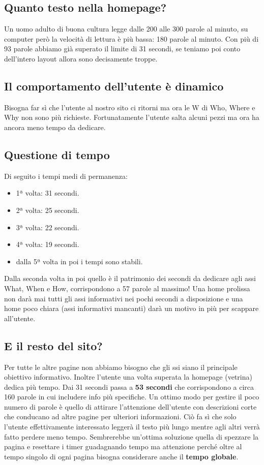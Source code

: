 			\subsection{Quanto testo nella homepage?} Un uomo adulto di buona cultura legge dalle 200 alle 300 parole al minuto, su computer però la velocità di lettura è più bassa: 180 parole al minuto. Con più di 93 parole abbiamo già superato il limite di 31 secondi, se teniamo poi conto dell'intero layout allora sono decisamente troppe.
			\subsection{Il comportamento dell'utente è dinamico} Bisogna far sì che l'utente al nostro sito ci ritorni ma ora le W di Who, Where e Why non sono più richieste. Fortunatamente l'utente salta alcuni pezzi ma ora ha ancora meno tempo da dedicare.
			
		\subsection{Questione di tempo}	
			Di seguito i tempi medi di permanenza:
			\begin{itemize}
				\item 1ª volta: 31 secondi.
				\item 2ª volta: 25 secondi.
				\item 3ª volta: 22 secondi.
				\item 4ª volta: 19 secondi.
				\item dalla 5ª volta in poi i tempi sono stabili.
			\end{itemize}
			Dalla seconda volta in poi quello è il patrimonio dei secondi da dedicare agli assi What, When e How, corrispondono a 57 parole al massimo!
			Una home prolissa non darà mai tutti gli assi informativi nei pochi secondi a disposizione e una home poco chiara (assi informativi mancanti) darà un motivo in più per scappare all'utente.
			
		\subsection{E il resto del sito?}
			Per tutte le altre pagine non abbiamo bisogno che gli ssi siano il principale obiettivo informativo. Inoltre l'utente una volta superata la homepage (vetrina) dedica più tempo. Dai 31 secondi passa a \textbf{53 secondi} che corrispondono a circa 160 parole in cui includere info più specifiche.
			Un ottimo modo per gestire il poco numero di parole è quello di attirare l'attenzione dell'utente con descrizioni corte che conducano ad altre pagine per ulteriori informazioni. Ciò fa sì che solo l'utente effettivamente interessato leggerà il testo più lungo mentre agli altri verrà fatto perdere meno tempo.
			Sembrerebbe un'ottima soluzione quella di spezzare la pagina e resettare i timer guadagnando tempo ma attenzione perché oltre al tempo singolo di ogni pagina bisogna considerare anche il \textbf{tempo globale}.
			

